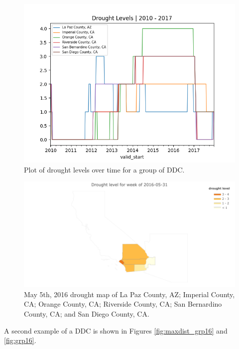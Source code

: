 \documentclass{article}
\begin{document}
\begin{figure}[hbt!]
    \centering
    \includegraphics[width = 0.8 \textwidth]{max_dist_group10.png}
    \caption{Plot of drought levels over time for a group of DDC.}
    \label{fig:maxdist_grp10}
\end{figure}

\begin{figure}[hbt!]
    \centering
    \includegraphics[width = \textwidth]{DroughtLevel_group10__wk_2016-05-31.png}
    \caption{May 5th, 2016 drought map of 
    La Paz County, AZ; 
    Imperial County, CA;
    Orange County, CA;
    Riverside County, CA; San Bernardino County, CA; and San Diego County, CA. }
    \label{fig:grp10}
\end{figure}

A second example of a DDC is shown in Figures \ref{fig:maxdist_grp16} and \ref{fig:grp16}. 
\end{document}

